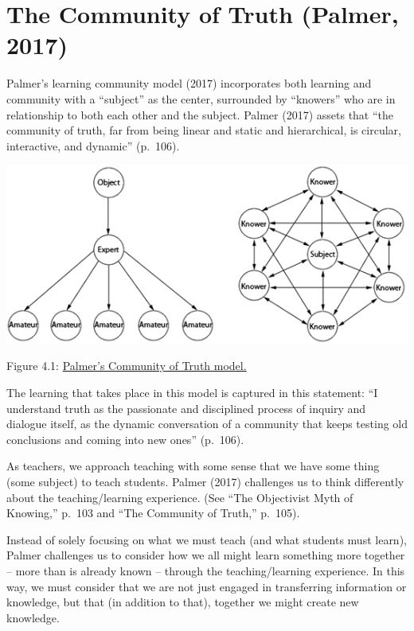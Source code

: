 \documentclass[
]{book}
\begin{document}
\hypertarget{the-community-of-truth-palmer-2017}{%
\section{The Community of Truth (Palmer, 2017)}\label{the-community-of-truth-palmer-2017}}

Palmer's learning community model (2017) incorporates both learning and community with a ``subject'' as the center, surrounded by ``knowers'' who are in relationship to both each other and the subject. Palmer (2017) assets that ``the community of truth, far from being linear and static and hierarchical, is circular, interactive, and dynamic'' (p.~106).

\includegraphics{assets/unit4/ParkerDiscussion.jpg}

Figure 4.1: \href{https://uncc.instructure.com/courses/342/pages/module-3-why-discussions}{Palmer's Community of Truth model.}

The learning that takes place in this model is captured in this statement: ``I understand truth as the passionate and disciplined process of inquiry and dialogue itself, as the dynamic conversation of a community that keeps testing old conclusions and coming into new ones'' (p.~106).

As teachers, we approach teaching with some sense that we have some thing (some subject) to teach students. Palmer (2017) challenges us to think differently about the teaching/learning experience. (See ``The Objectivist Myth of Knowing,'' p.~103 and ``The Community of Truth,'' p.~105).

Instead of solely focusing on what we must teach (and what students must learn), Palmer challenges us to consider how we all might learn something more together -- more than is already known -- through the teaching/learning experience. In this way, we must consider that we are not just engaged in transferring information or knowledge, but that (in addition to that), together we might create new knowledge.
\end{document}
